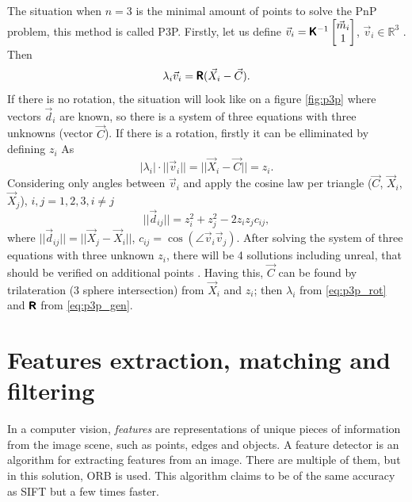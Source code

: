 The situation when $n=3$ is the minimal amount of points to solve the PnP problem, this method is called P3P.  
Firstly, let us define $\vec{v}_i = \pmb{\mathsf{K}}^{-1}\begin{bmatrix}\vec{m}_i \\ 1 \end{bmatrix}$, $\vec{v}_i \in \mathbb{R}^3$ . Then
\begin{equation}
    \label{eq:p3p_gen}
    \lambda_i \vec{v}_i = \pmb{\mathsf{R}} (\vec{X}_i - \vec{C}).
\end{equation}
If there is no rotation, the situation will look like on a figure \autoref{fig:p3p} where vectors $\vec{d}_i$ are known, so there is a system of three equations with three unknowns (vector $\vec{C}$).
If there is a rotation, firstly it can be elliminated by defining $z_i$ As
\begin{equation}
    \label{eq:p3p_rot}
    |\lambda_i| \cdot ||\vec{v}_i|| = || \vec{X}_i - \vec{C} || = z_i.
\end{equation}
Considering only angles between $\vec{v}_i$ and apply the cosine law per triangle ($\vec{C}$, $\vec{X}_i$, $\vec{X}_j$), $i, j = 1, 2, 3, i \neq j$
\begin{equation}
    ||\vec{d}_{ij}|| = z_i^2 + z_j^2 - 2z_iz_jc_{ij},
\end{equation}
where $||\vec{d}_{ij}|| = || \vec{X}_j - \vec{X}_i ||$, $c_{ij} = \cos(\angle \vec{v}_i \vec{v}_j)$.
After solving the system of three equations with three unknown $z_i$, there will be 4 sollutions including unreal, that should be verified on additional points \cite{Fischler1981}.
Having this, $\vec{C}$ can be found by trilateration (3 sphere intersection) from $\vec{X}_i$ and $z_i$; then $\lambda_i$ from \eqref{eq:p3p_rot} and $\pmb{\mathsf{R}}$ from \eqref{eq:p3p_gen}.

\section{Features extraction, matching and filtering}
\label{sec:features}
In a computer vision, \textit{features} are representations of unique pieces of information from the image scene, such as points, edges and objects.
A feature detector is an algorithm for extracting features from an image.
There are multiple of them, but in this solution, ORB \cite{Rublee2011} is used. 
This algorithm claims to be of the same accuracy as SIFT but a few times faster. 


